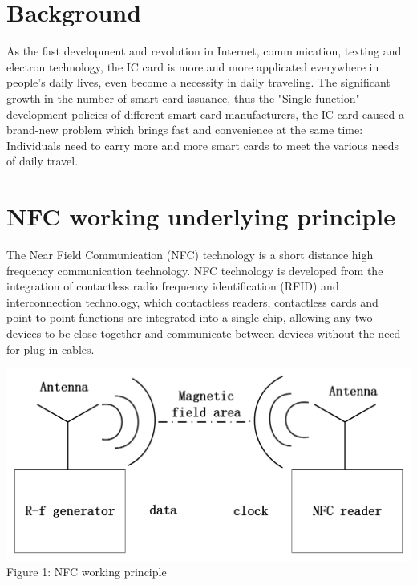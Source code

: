 \documentclass[11pt, a4paper]{article}
\begin{document}
\vspace{1cm}

\begin{center}

\tableofcontents

\end{center}

\newpage

\section{Background}

As the fast development and revolution in Internet, communication, texting and electron technology, the IC card is more and more applicated everywhere in people's daily lives, even become a necessity in daily traveling.
The significant growth in the number of smart card issuance, thus the "Single function" development policies of different smart card manufacturers, the IC card caused a brand-new problem which brings fast and convenience at the same time: Individuals need to carry more and more smart cards to meet the various needs of daily travel.

\section{NFC working underlying principle}
The Near Field Communication (NFC) technology is a short distance high frequency communication technology. NFC technology is developed from the integration of contactless radio frequency identification (RFID) and interconnection technology, which contactless readers, contactless cards and point-to-point functions are integrated into a single chip, allowing any two devices to be close together and communicate between devices without the need for plug-in cables.

\begin{center}
\includegraphics[scale=0.4]{pic1.png}
\\
Figure 1: NFC working principle
\end{center}
\end{document}
